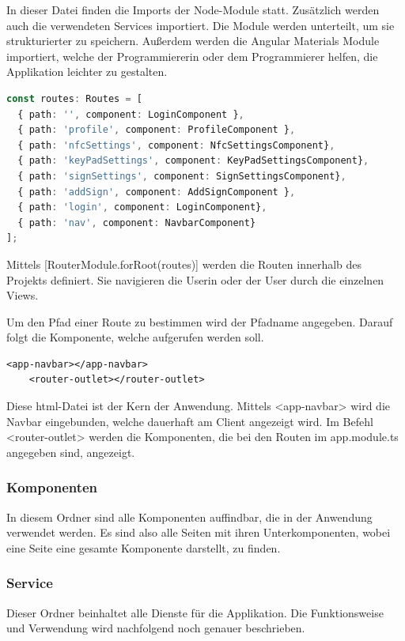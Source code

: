 In dieser Datei finden die Imports der Node-Module statt. Zusätzlich werden auch die verwendeten Services importiert. Die Module werden unterteilt, um sie strukturierter zu speichern. Außerdem werden die Angular Materials Module importiert, welche der Programmiererin oder dem Programmierer helfen, die Applikation leichter zu gestalten. 

\begin{lstlisting}[language=typescript, caption=Routing der Komponenten in der app.module.ts]
const routes: Routes = [
  { path: '', component: LoginComponent },
  { path: 'profile', component: ProfileComponent },
  { path: 'nfcSettings', component: NfcSettingsComponent},
  { path: 'keyPadSettings', component: KeyPadSettingsComponent},
  { path: 'signSettings', component: SignSettingsComponent},
  { path: 'addSign', component: AddSignComponent },
  { path: 'login', component: LoginComponent},
  { path: 'nav', component: NavbarComponent}
];
\end{lstlisting}

Mittels [RouterModule.forRoot(routes)] werden die Routen innerhalb des Projekts definiert. Sie navigieren die Userin oder der User durch die einzelnen Views.

Um den Pfad einer Route zu bestimmen wird der Pfadname angegeben.  Darauf folgt die Komponente, welche aufgerufen werden soll. 

\begin{lstlisting}[caption=app.component.html]
    <app-navbar></app-navbar>
    <router-outlet></router-outlet>    
\end{lstlisting}

Diese html-Datei ist der Kern der Anwendung. Mittels <app-navbar> wird die Navbar eingebunden, welche dauerhaft am Client angezeigt wird. Im Befehl <router-outlet> werden die Komponenten, die bei den Routen im app.module.ts angegeben sind, angezeigt.

\subsubsection{Komponenten}
In diesem Ordner sind alle Komponenten auffindbar, die in der Anwendung verwendet werden. Es sind also alle Seiten mit ihren Unterkomponenten, wobei eine Seite eine gesamte Komponente darstellt, zu finden.

\subsubsection{Service}
Dieser Ordner beinhaltet alle Dienste für die Applikation. Die Funktionsweise und Verwendung wird nachfolgend noch genauer beschrieben.

